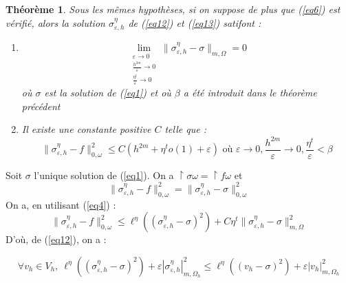 \documentclass{article}
\newtheorem{theorem}{Théorème}[subsection]
\begin{document}
\begin{theorem}
Sous les mêmes hypothèses, si on suppose de plus que (\ref{eq6}) est vérifié, alors la solution $\sigma_{\varepsilon,h}^\eta$ de (\ref{eq12}) et (\ref{eq13}) satifont :
\begin{enumerate}
	\item \[\lim_{\substack{\varepsilon\to 0\\ \frac{h^{2m}}{\varepsilon}\to 0 \\ \frac{\eta^t}{\varepsilon}\to 0}} \|\sigma^\eta_{\varepsilon, h}-\sigma\|_{m,\Omega}=0\]
où $\sigma$ est la solution de (\ref{eq1}) et où $\beta$ a été introduit dans le théorème précédent
	\item Il existe une constante positive $C$ telle que :
		\[\|\sigma_{\varepsilon, h}^\eta - f\|_{0,\omega}^2\leq C\left(h^{2m}+\eta^t o(1)+\varepsilon\right) \text{ où } \varepsilon\to 0, \frac{h^{2m}}{\varepsilon}\to 0, \frac{\eta^t}{\varepsilon}<\beta\]
\end{enumerate}
\end{theorem}

\begin{dem}
Soit $\sigma$ l'unique solution de (\ref{eq1}). On a $\restriction{\sigma}{\omega}=\restriction{f}{\omega}$ et
	\[\|\sigma_{\varepsilon,h}^\eta -f\|_{0,\omega}^2=\|\sigma_{\varepsilon,h}^\eta -\sigma\|_{0,\omega}^2\]
On a, en utilisant (\ref{eq4}) : 
\begin{equation} \label{eq15} \|\sigma_{\varepsilon,h}^\eta -f\|_{0,\omega}^2\leq \ell^\eta \left( \left(\sigma_{\varepsilon, h}^\eta -\sigma\right)^2\right) + C\eta^t \|\sigma_{\varepsilon, h}^\eta -\sigma\|_{m,\Omega}^2 \end{equation}
D'où, de (\ref{eq12}), on a :

\begin{equation} \label{eq16} \forall v_h\in V_h,\ \ell^\eta\left( \left(\sigma_{\varepsilon, h}^\eta -\sigma\right)^2\right) + \varepsilon |\sigma^\eta_{\varepsilon, h}|^2_{m,\Omega_h}\leq \ell^\eta \left( \left(v_h -\sigma\right)^2\right) + \varepsilon |v_h|^2_{m,\Omega_h} \end{equation}

\end{dem}



\end{document}
